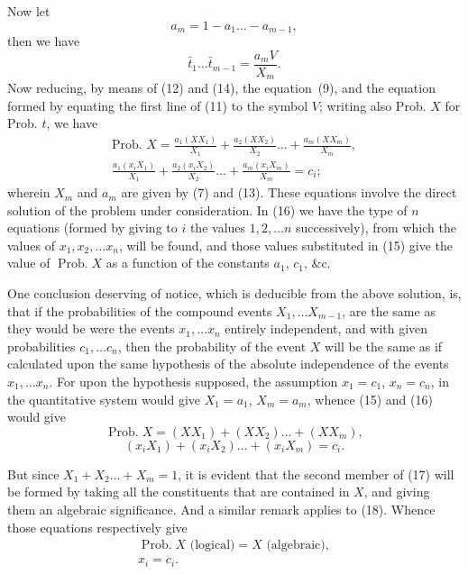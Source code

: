 \documentclass[oneside]{book}
\begin{document}
Now let
\[
  a_m = 1 - a_1 \dotsc - a_{m-1},    \tag{13}
\]
then we have
\[
  \bar{t}_1 \dotsc \bar{t}_{m-1} = \frac{a_m V}{X_m}.   \tag{14}
\]
Now reducing, by means of (12) and (14), the equation~(9),
and the equation formed by equating the first line of (11) to the
symbol $V$; writing also Prob. $X$ for Prob. $t$, we have
\begin{gather*}
  \text{Prob. }X
= \frac{a_1(X X_1)}{X_1}
+ \frac{a_2(X X_2)}{X_2} \dotsc
+ \frac{a_m(X X_m)}{X_m},             \tag{15}
\\
  \frac{a_1(x_i X_1)}{X_1}
+ \frac{a_2(x_i X_2)}{X_2} \dotsc
+ \frac{a_m(x_i X_m)}{X_m} = c_i;    \tag{16}
\end{gather*}
wherein $X_m$ and $a_m$ are given by (7) and (13).
These equations involve the direct solution of the problem
under consideration. In (16) we have the type of $n$ equations
(formed by giving to $i$ the values $1, 2,\dotsc n$ successively), from
which the values of $x_1, x_2,\dotsc x_n$, will be found, and those values
substituted in (15) give the value of $\operatorname{Prob. } X$ as a function of
the constants $a_1$, $c_1$, \&c.

One conclusion deserving of notice, which is deducible from
the above solution, is, that if the probabilities of the compound
events $X_1,\dotsc X_{m-1}$, are the same as they would be were the
events $x_1, \dotsc x_n$ entirely independent, and with given probabilities
$c_1,\dotsc c_n$, then the probability of the event $X$ will be the
same as if calculated upon the same hypothesis of the absolute
independence of the events $x_1, \dotsc x_n$. For upon the hypothesis
supposed, the assumption $x_1 = c_1$, $x_n = c_n$, in the quantitative
system would give $X_1 = a_1$, $X_m = a_m$, whence (15) and (16)
would give
\begin{equation}\tag{17}
\operatorname{Prob. } X = (X X_1) + (X X_2)\dotsc + (X X_m),
\end{equation}
\begin{equation}\tag{18}
(x_i X_1)+(x_i X_2)\dotsc + (x_i X_m) = c_i.
\end{equation}

But since $X_1 + X_2\dotsc + X_m=1$, it is evident that the second
member of (17) will be formed by taking all the constituents that
are contained in $X$, and giving them an algebraic significance.
And a similar remark applies to (18). Whence those equations
respectively give
\begin{gather*}
\operatorname{Prob. } X \text{ (logical)} = X \text{ (algebraic)}, \\
x_i = c_i.
\end{gather*}
\end{document}
